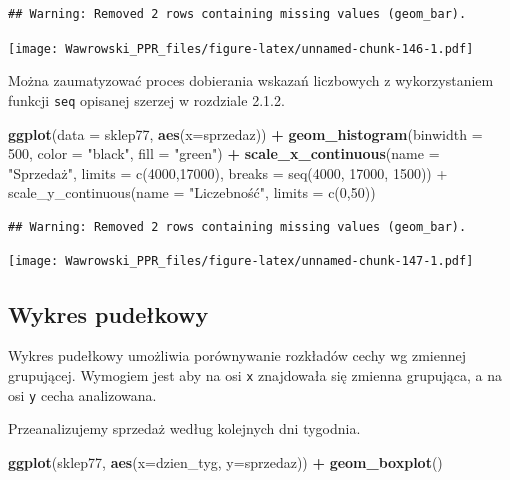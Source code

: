 \documentclass[]{book}
\newenvironment{Shaded}{\begin{snugshade}}{\end{snugshade}}
\newcommand{\KeywordTok}[1]{\textcolor[rgb]{0.13,0.29,0.53}{\textbf{#1}}}
\newcommand{\DataTypeTok}[1]{\textcolor[rgb]{0.13,0.29,0.53}{#1}}
\newcommand{\DecValTok}[1]{\textcolor[rgb]{0.00,0.00,0.81}{#1}}
\newcommand{\StringTok}[1]{\textcolor[rgb]{0.31,0.60,0.02}{#1}}
\newcommand{\OperatorTok}[1]{\textcolor[rgb]{0.81,0.36,0.00}{\textbf{#1}}}
\newcommand{\NormalTok}[1]{#1}
\begin{document}
\begin{verbatim}
## Warning: Removed 2 rows containing missing values (geom_bar).
\end{verbatim}

\texttt{[image: Wawrowski\_PPR\_files/figure-latex/unnamed-chunk-146-1.pdf]}

Można zaumatyzować proces dobierania wskazań liczbowych z wykorzystaniem
funkcji \texttt{seq} opisanej szerzej w rozdziale 2.1.2.

\begin{Shaded}
\begin{Highlighting}[]
\KeywordTok{ggplot}\NormalTok{(}\DataTypeTok{data =}\NormalTok{ sklep77, }\KeywordTok{aes}\NormalTok{(}\DataTypeTok{x=}\NormalTok{sprzedaz)) }\OperatorTok{+}
\StringTok{  }\KeywordTok{geom_histogram}\NormalTok{(}\DataTypeTok{binwidth =} \DecValTok{500}\NormalTok{, }
                 \DataTypeTok{color =} \StringTok{"black"}\NormalTok{, }\DataTypeTok{fill =} \StringTok{"green"}\NormalTok{) }\OperatorTok{+}
\StringTok{  }\KeywordTok{scale_x_continuous}\NormalTok{(}\DataTypeTok{name =} \StringTok{"Sprzedaż", }
\StringTok{                     limits = c(4000,17000),}
\StringTok{                     breaks = seq(4000, 17000, 1500)) +}
\StringTok{  scale_y_continuous(name = "}\NormalTok{Liczebność}\StringTok{",}
\StringTok{                     limits = c(0,50))}
\end{Highlighting}
\end{Shaded}

\begin{verbatim}
## Warning: Removed 2 rows containing missing values (geom_bar).
\end{verbatim}

\texttt{[image: Wawrowski\_PPR\_files/figure-latex/unnamed-chunk-147-1.pdf]}

\subsection{Wykres pudełkowy}\label{wykres-pudekowy}

Wykres pudełkowy umożliwia porównywanie rozkładów cechy wg zmiennej
grupującej. Wymogiem jest aby na osi \texttt{x} znajdowała się zmienna
grupująca, a na osi \texttt{y} cecha analizowana.

Przeanalizujemy sprzedaż według kolejnych dni tygodnia.

\begin{Shaded}
\begin{Highlighting}[]
\KeywordTok{ggplot}\NormalTok{(sklep77, }\KeywordTok{aes}\NormalTok{(}\DataTypeTok{x=}\NormalTok{dzien_tyg, }\DataTypeTok{y=}\NormalTok{sprzedaz)) }\OperatorTok{+}\StringTok{ }\KeywordTok{geom_boxplot}\NormalTok{()}
\end{Highlighting}
\end{Shaded}
\end{document}
